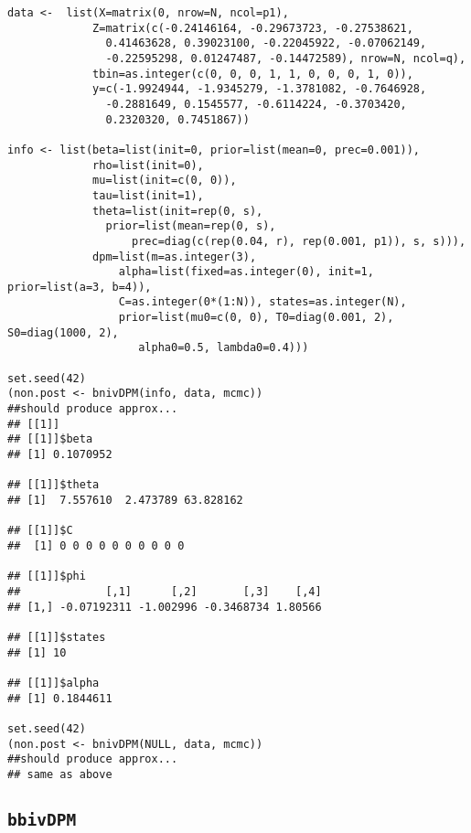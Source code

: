 \documentclass[12pt,oneside]{article}
\begin{document}
\begin{verbatim}
data <-  list(X=matrix(0, nrow=N, ncol=p1),
             Z=matrix(c(-0.24146164, -0.29673723, -0.27538621,
               0.41463628, 0.39023100, -0.22045922, -0.07062149,
               -0.22595298, 0.01247487, -0.14472589), nrow=N, ncol=q),
             tbin=as.integer(c(0, 0, 0, 1, 1, 0, 0, 0, 1, 0)),
             y=c(-1.9924944, -1.9345279, -1.3781082, -0.7646928,
               -0.2881649, 0.1545577, -0.6114224, -0.3703420,
               0.2320320, 0.7451867))

info <- list(beta=list(init=0, prior=list(mean=0, prec=0.001)),
             rho=list(init=0),
             mu=list(init=c(0, 0)),
             tau=list(init=1),
             theta=list(init=rep(0, s),
               prior=list(mean=rep(0, s),
                   prec=diag(c(rep(0.04, r), rep(0.001, p1)), s, s))),
             dpm=list(m=as.integer(3),
                 alpha=list(fixed=as.integer(0), init=1, prior=list(a=3, b=4)),
                 C=as.integer(0*(1:N)), states=as.integer(N),
                 prior=list(mu0=c(0, 0), T0=diag(0.001, 2), S0=diag(1000, 2),
                    alpha0=0.5, lambda0=0.4)))

set.seed(42)
(non.post <- bnivDPM(info, data, mcmc))
##should produce approx...
## [[1]]
## [[1]]$beta
## [1] 0.1070952

## [[1]]$theta
## [1]  7.557610  2.473789 63.828162

## [[1]]$C
##  [1] 0 0 0 0 0 0 0 0 0 0

## [[1]]$phi
##             [,1]      [,2]       [,3]    [,4]
## [1,] -0.07192311 -1.002996 -0.3468734 1.80566

## [[1]]$states
## [1] 10

## [[1]]$alpha
## [1] 0.1844611

set.seed(42)
(non.post <- bnivDPM(NULL, data, mcmc))
##should produce approx...
## same as above
\end{verbatim}

\subsection{\texttt{bbivDPM}}
\end{document}

